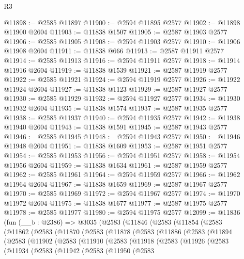 \begin{lexlean}{R3}
\begin{coremodule}
@11898 := @2585 @11897
@11900 := @2594 @11895 @2577
@11902 := @11898 @11900 @2604
@11903 := @11838 @1507
@11905 := @2587 @11903 @2577
@11906 := @2585 @11905
@11908 := @2594 @11903 @2577
@11910 := @11906 @11908 @2604
@11911 := @11838 @666
@11913 := @2587 @11911 @2577
@11914 := @2585 @11913
@11916 := @2594 @11911 @2577
@11918 := @11914 @11916 @2604
@11919 := @11838 @1539
@11921 := @2587 @11919 @2577
@11922 := @2585 @11921
@11924 := @2594 @11919 @2577
@11926 := @11922 @11924 @2604
@11927 := @11838 @1123
@11929 := @2587 @11927 @2577
@11930 := @2585 @11929
@11932 := @2594 @11927 @2577
@11934 := @11930 @11932 @2604
@11935 := @11838 @1574
@11937 := @2587 @11935 @2577
@11938 := @2585 @11937
@11940 := @2594 @11935 @2577
@11942 := @11938 @11940 @2604
@11943 := @11838 @1591
@11945 := @2587 @11943 @2577
@11946 := @2585 @11945
@11948 := @2594 @11943 @2577
@11950 := @11946 @11948 @2604
@11951 := @11838 @1609
@11953 := @2587 @11951 @2577
@11954 := @2585 @11953
@11956 := @2594 @11951 @2577
@11958 := @11954 @11956 @2604
@11959 := @11838 @1634
@11961 := @2587 @11959 @2577
@11962 := @2585 @11961
@11964 := @2594 @11959 @2577
@11966 := @11962 @11964 @2604
@11967 := @11838 @1659
@11969 := @2587 @11967 @2577
@11970 := @2585 @11969
@11972 := @2594 @11967 @2577
@11974 := @11970 @11972 @2604
@11975 := @11838 @1677
@11977 := @2587 @11975 @2577
@11978 := @2585 @11977
@11980 := @2594 @11975 @2577
@12099 := @11836
    (fun (__b : @2386) =>
    @3035
      (@2583
        (@11846
          (@2583
            (@11854
              (@2583
                (@11862
                  (@2583
                    (@11870
                      (@2583
                        (@11878
                          (@2583
                            (@11886
                              (@2583
                                (@11894
                                  (@2583
                                    (@11902
                                      (@2583
                                        (@11910
                                          (@2583
                                            (@11918
                                              (@2583
                                                (@11926
                                                  (@2583
                                                    (@11934
                                                      (@2583
                                                        (@11942
                                                          (@2583
                                                            (@11950
                                                              (@2583

\end{coremodule}
\end{lexlean}
